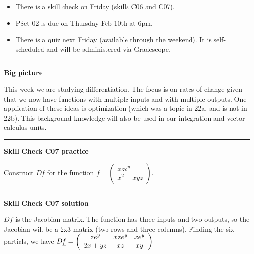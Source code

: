 \documentclass[12pt,letterpaper,noanswers]{exam}
\newcommand{\mb}[1]{\underline{#1}}
\begin{document}
 \pdfpageheight 11in 
  \pdfpagewidth 8.5in





\begin{itemize}
\itemsep0em
    \item There is a skill check on Friday (skills C06 and C07). 
    \item PSet 02 is due on Thursday Feb 10th at 6pm.
    \item There is a quiz next Friday (available through the weekend).  It is self-scheduled and will be administered via Gradescope.
\end{itemize}

\hrule
\vspace{0.2cm}


\noindent\textbf{Big picture}

This week we are studying differentiation.  The focus is on rates of change given that we now have functions with multiple inputs and with multiple outputs.  One application of these ideas is optimization (which was a topic in 22a, and is not in 22b).  This background knowledge will also be used in our integration and vector calculus units.

\vspace{0.2cm}
\hrule
\vspace{0.2cm}

\noindent\textbf{Skill Check C07 practice}

Construct $D \mb{f}$ for the function $\displaystyle\mb{f} =  \left(\begin{array}{c}xze^y \\ x^2 + xyz \end{array}\right)$.

\vspace{0.2cm}
\hrule
\vspace{0.2cm}

\noindent\textbf{Skill Check C07 solution}

$D \mb{f}$ is the Jacobian matrix.  The function has three inputs and two outputs, so the Jacobian will be a 2x3 matrix (two rows and three columns).  Finding the six partials, we have $D\mb{f} = \left(\begin{array}{c c c}ze^y & x z e^y & xe^y \\ 2x + yz & xz & xy \end{array}\right)$
\end{document}
